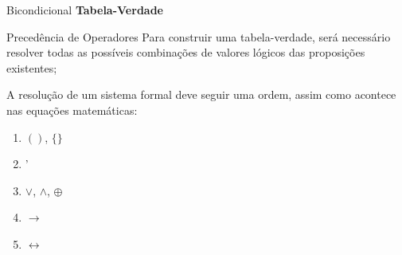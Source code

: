 \documentclass[aspectratio=169]{beamer}
\begin{document}
\begin{frame}{Bicondicional}
    \textbf{Tabela-Verdade}
    \begin{table}[hb]
    \end{table}
\end{frame}

\begin{frame}{Precedência de Operadores}
    Para construir uma tabela-verdade, será necessário resolver todas as possíveis
    combinações de valores lógicos das proposições existentes;
    \vspace{2mm}

    A resolução de um sistema formal deve seguir uma ordem,
    assim como acontece nas equações matemáticas:

    \begin{enumerate}
        \item $()$, $\{ \}$
        \item '
        \item  $\vee$, $\wedge$, $\oplus$
        \item $\rightarrow$
        \item $\leftrightarrow$
    \end{enumerate}
\end{frame}
\end{document}
